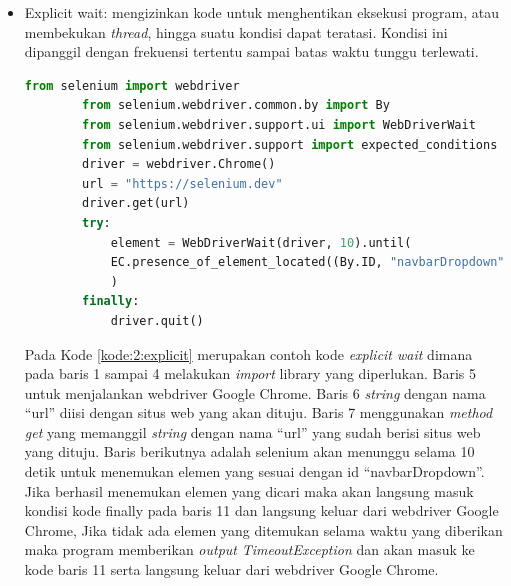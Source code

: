 \begin{itemize}
	\item Explicit wait: mengizinkan kode untuk menghentikan eksekusi program, atau membekukan \textit{thread}, hingga suatu kondisi dapat teratasi. Kondisi ini dipanggil dengan frekuensi tertentu sampai batas waktu tunggu terlewati.
	\begin{lstlisting}[language=python, caption=Contoh kode Explicit wait, label=kode:2:explicit]
		from selenium import webdriver
		from selenium.webdriver.common.by import By
		from selenium.webdriver.support.ui import WebDriverWait
		from selenium.webdriver.support import expected_conditions as EC
		driver = webdriver.Chrome()
		url = "https://selenium.dev"
		driver.get(url)	
		try:
			element = WebDriverWait(driver, 10).until(
			EC.presence_of_element_located((By.ID, "navbarDropdown"))
			)
		finally:
			driver.quit()
	\end{lstlisting}
	Pada Kode \ref{kode:2:explicit} merupakan contoh kode \textit{explicit wait} dimana pada baris 1 sampai 4 melakukan \textit{import} library yang diperlukan. Baris 5 untuk menjalankan webdriver Google Chrome. Baris 6 \textit{string} dengan nama ``url'' diisi dengan situs web yang akan dituju. Baris 7 menggunakan \textit{method get} yang memanggil \textit{string} dengan nama ``url'' yang sudah berisi situs web yang dituju. Baris berikutnya adalah selenium akan menunggu selama 10 detik untuk menemukan elemen yang sesuai dengan id ``navbarDropdown''. Jika berhasil menemukan elemen yang dicari maka akan langsung masuk kondisi kode finally pada baris 11 dan langsung keluar dari webdriver Google Chrome, Jika tidak ada elemen yang ditemukan selama waktu yang diberikan maka program memberikan \textit{output} \textit{TimeoutException} dan akan masuk ke kode baris 11 serta langsung keluar dari webdriver Google Chrome.	
\end{itemize}

